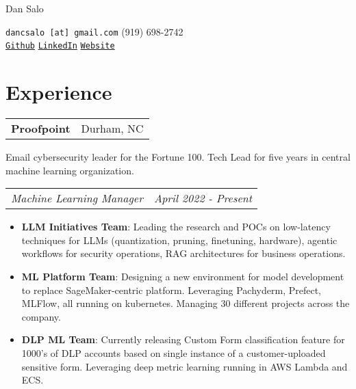 \documentclass[letterpaper,11pt]{article}
\makeatletter
\newcommand{\resumeItem}[2]{
  \item\small{
    \textbf{#1}{: #2 \vspace{-2pt}}
  }
}
\newcommand{\resumeSubSubheading}[2]{
   \begin{addmargin}[1em]{0em}
    \begin{tabular*}{0.97\textwidth}{l@{\extracolsep{\fill}}r}
      \textit{#1} & \textit{\small #2} \\
    \end{tabular*}\vspace{-5pt}
    \end{addmargin}
}
\newcommand{\resumeItemListStart}{\begin{itemize}}
\newcommand{\resumeItemListEnd}{\end{itemize}\vspace{-5pt}}
\newcommand{\resumeJob}[3]{
   \vspace{3pt}
    \begin{tabular*}{0.97\textwidth}{l@{\extracolsep{\fill}}r}
      \textbf{#1} & #2 \\
    \end{tabular*}\vspace{4pt}
   \small{#3} \vspace{6pt}
}
\makeatother
\begin{document}
\begin{minipage}[t][1cm][b]{0.3\textwidth}
\hspace{-\hoffset}\raggedright \Huge {} Dan Salo \normalsize
\end{minipage}
\begin{minipage}[t][1cm][b]{0.69\textwidth}
\footnotesize
\raggedleft \texttt{dancsalo [at] gmail.com} \hspace{0.1cm}\textbullet \hspace{0.1cm} (919) 698-2742 \\ \texttt{\href{https://github.com/dancsalo}{Github}} \hspace{0.1cm}\textbullet \hspace{0.1cm} \texttt{\href{https://www.linkedin.com/in/dancsalo/}{LinkedIn}} \hspace{0.1cm}\textbullet \hspace{0.1cm}  \texttt{\href{https://dancsalo.github.io/about/}{Website}}
\end{minipage}

\smallskip
\smallskip
\smallskip

\section{Experience}
\resumeJob{Proofpoint}{Durham, NC}{Email cybersecurity leader for the Fortune 100. Tech Lead for five years in central machine learning organization.}

\resumeSubSubheading{Machine Learning Manager}{April 2022 - Present}
      \resumeItemListStart
        \resumeItem{LLM Initiatives Team}
          {Leading the research and POCs on low-latency techniques for LLMs (quantization, pruning, finetuning, hardware), agentic workflows for security operations, RAG architectures for business operations.}
        \resumeItem{ML Platform Team}
          {Designing a new environment for model development to replace SageMaker-centric platform. Leveraging Pachyderm, Prefect, MLFlow, all running on kubernetes. Managing 30 different projects across the company.}
        \resumeItem{DLP ML Team}{Currently releasing Custom Form classification feature for 1000's of DLP accounts based on single instance of a customer-uploaded sensitive form. Leveraging deep metric learning running in AWS Lambda and ECS. }
      \resumeItemListEnd

\smallskip
\smallskip
\end{document}
